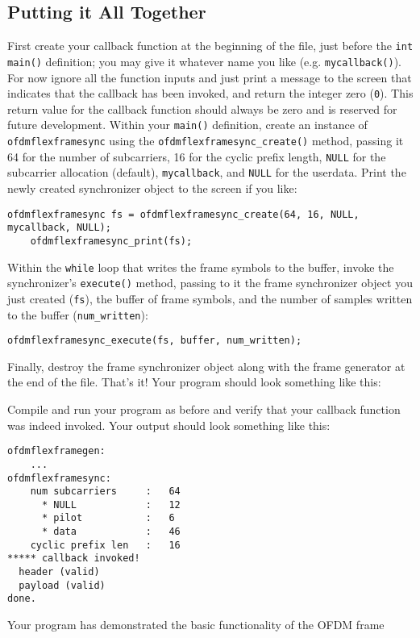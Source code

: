 \subsection{Putting it All Together}
\label{tutorial:ofdmflexframe:xxx}
First create your callback function at the beginning of the file, just
before the {\tt int main()} definition;
you may give it whatever name you like (e.g. {\tt mycallback()}).
For now ignore all the function inputs and just print a message to the
screen that indicates that the callback has been invoked,
and return the integer zero ({\tt 0}).
This return value for the callback function should always be zero
and is reserved for future development.
Within your {\tt main()} definition, create an instance of
{\tt ofdmflexframesync} using the {\tt ofdmflexframesync\_create()}
method, passing it
  64 for the number of subcarriers,
  16 for the cyclic prefix length,
  {\tt NULL} for the subcarrier allocation (default),
  {\tt mycallback}, and
  {\tt NULL} for the userdata.
Print the newly created synchronizer object to the screen if you like:
%
\begin{Verbatim}[fontsize=\small]
    ofdmflexframesync fs = ofdmflexframesync_create(64, 16, NULL, mycallback, NULL);
    ofdmflexframesync_print(fs);
\end{Verbatim}
%
Within the {\tt while} loop that writes the frame symbols to the buffer,
invoke the synchronizer's {\tt execute()} method,
passing to it the frame synchronizer object you just created ({\tt fs}),
the buffer of frame symbols,
and the number of samples written to the buffer ({\tt num\_written}):
%
\begin{Verbatim}[fontsize=\small]
    ofdmflexframesync_execute(fs, buffer, num_written);
\end{Verbatim}
%
Finally, destroy the frame synchronizer object along with the frame
generator at the end of the file.
That's it!
Your program should look something like this:
%

%
Compile and run your program as before and verify that your callback
function was indeed invoked.
Your output should look something like this:
%
\begin{Verbatim}[fontsize=\small]
ofdmflexframegen:
    ...
ofdmflexframesync:
    num subcarriers     :   64
      * NULL            :   12
      * pilot           :   6
      * data            :   46
    cyclic prefix len   :   16
***** callback invoked!
  header (valid)
  payload (valid)
done.
\end{Verbatim}
%
Your program has demonstrated the basic functionality of the OFDM frame
